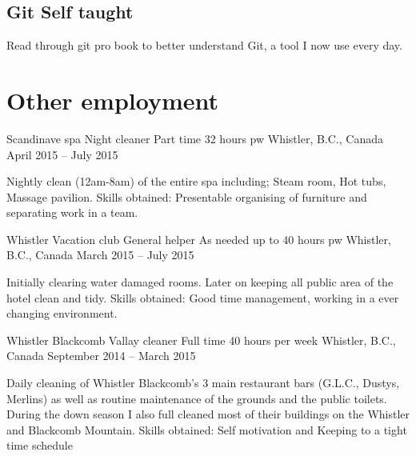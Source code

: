 \documentclass{my_cv}
\begin{document}
\subsection{\textbf {Git \hfill Self taught}}

Read through git pro book to better understand Git, a tool I now use every day.


\section{Other employment}

\workDetails
{Scandinave spa}
{Night cleaner}
{Part time 32 hours pw}
{Whistler, B.C., Canada}
{April 2015 -- July 2015}
 
\workdetails
{ Nightly clean (12am-8am) of the entire spa including; Steam room, Hot tubs, Massage pavilion.}
{Skills obtained: Presentable organising of furniture and separating work in a team. }
\stopworkdetails



\workDetails
{Whistler Vacation club}
{General helper}
{As needed up to 40 hours pw}
{Whistler, B.C., Canada}
{March 2015 -- July 2015}

\workdetails
{Initially clearing water damaged rooms.}
{Later on keeping all public area of the hotel clean and tidy.}
{Skills obtained: Good time management, working in a ever changing environment.}
\stopworkdetails



\workDetails
{Whistler Blackcomb}
{Vallay cleaner}
{Full time 40 hours per week}
{Whistler, B.C., Canada}
{September 2014 -- March 2015}

\workdetails
{Daily cleaning of Whistler Blackcomb's 3 main restaurant bars (G.L.C., Dustys, Merlins) as well as routine maintenance of the grounds and the public toilets.}
{During the down season I also full cleaned most of their buildings on the Whistler and Blackcomb Mountain.}
{Skills obtained: Self motivation and Keeping to a tight time schedule}
\stopworkdetails


%
%
\end{document}
